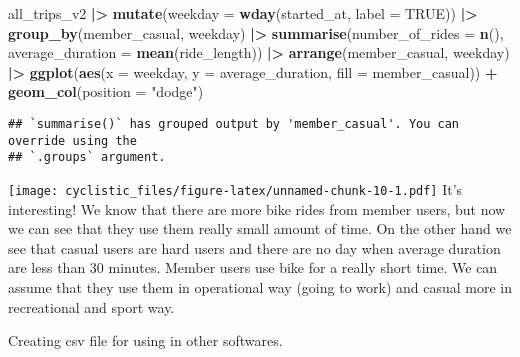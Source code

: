 \documentclass[
]{article}
\newenvironment{Shaded}{\begin{snugshade}}{\end{snugshade}}
\newcommand{\AttributeTok}[1]{\textcolor[rgb]{0.13,0.29,0.53}{#1}}
\newcommand{\ConstantTok}[1]{\textcolor[rgb]{0.56,0.35,0.01}{#1}}
\newcommand{\FunctionTok}[1]{\textcolor[rgb]{0.13,0.29,0.53}{\textbf{#1}}}
\newcommand{\NormalTok}[1]{#1}
\newcommand{\OtherTok}[1]{\textcolor[rgb]{0.56,0.35,0.01}{#1}}
\newcommand{\SpecialCharTok}[1]{\textcolor[rgb]{0.81,0.36,0.00}{\textbf{#1}}}
\newcommand{\StringTok}[1]{\textcolor[rgb]{0.31,0.60,0.02}{#1}}
\begin{document}
\begin{Shaded}
\begin{Highlighting}[]
\NormalTok{all\_trips\_v2 }\SpecialCharTok{|\textgreater{}} 
  \FunctionTok{mutate}\NormalTok{(}\AttributeTok{weekday =} \FunctionTok{wday}\NormalTok{(started\_at, }\AttributeTok{label =} \ConstantTok{TRUE}\NormalTok{)) }\SpecialCharTok{|\textgreater{}}
  \FunctionTok{group\_by}\NormalTok{(member\_casual, weekday) }\SpecialCharTok{|\textgreater{}} 
  \FunctionTok{summarise}\NormalTok{(}\AttributeTok{number\_of\_rides =} \FunctionTok{n}\NormalTok{(), }\AttributeTok{average\_duration =} \FunctionTok{mean}\NormalTok{(ride\_length)) }\SpecialCharTok{|\textgreater{}} 
  \FunctionTok{arrange}\NormalTok{(member\_casual, weekday) }\SpecialCharTok{|\textgreater{}} 
  \FunctionTok{ggplot}\NormalTok{(}\FunctionTok{aes}\NormalTok{(}\AttributeTok{x =}\NormalTok{ weekday, }\AttributeTok{y =}\NormalTok{ average\_duration, }\AttributeTok{fill =}\NormalTok{ member\_casual)) }\SpecialCharTok{+}
  \FunctionTok{geom\_col}\NormalTok{(}\AttributeTok{position =} \StringTok{"dodge"}\NormalTok{)}
\end{Highlighting}
\end{Shaded}

\begin{verbatim}
## `summarise()` has grouped output by 'member_casual'. You can override using the
## `.groups` argument.
\end{verbatim}

\texttt{[image: cyclistic\_files/figure-latex/unnamed-chunk-10-1.pdf]}
It's interesting! We know that there are more bike rides from member
users, but now we can see that they use them really small amount of
time. On the other hand we see that casual users are hard users and
there are no day when average duration are less than 30 minutes. Member
users use bike for a really short time. We can assume that they use them
in operational way (going to work) and casual more in recreational and
sport way.

Creating csv file for using in other softwares.

\begin{Shaded}
\end{Shaded}
\end{document}
